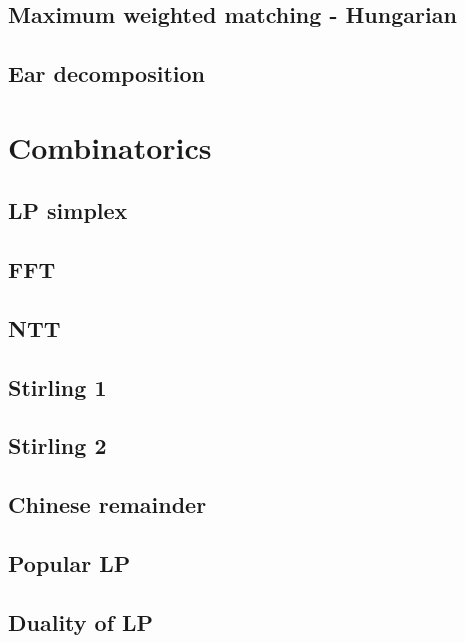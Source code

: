 \subsection{Maximum weighted matching - Hungarian}
\raggedbottom
\hrulefill
\subsection{Ear decomposition}
\raggedbottom
\hrulefill

\section{Combinatorics}
\subsection{LP simplex}
\raggedbottom
\hrulefill
\subsection{FFT}
\raggedbottom
\hrulefill
\subsection{NTT}
\raggedbottom
\hrulefill
\subsection{Stirling 1}
\raggedbottom
\hrulefill
\subsection{Stirling 2}

\hrulefill
\subsection{Chinese remainder}
\raggedbottom
\hrulefill
\subsection{Popular LP}

\hrulefill
\subsection{Duality of LP}

\hrulefill
